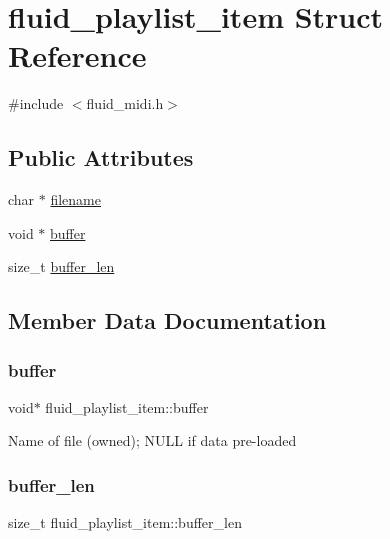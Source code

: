 \hypertarget{structfluid__playlist__item}{}\section{fluid\+\_\+playlist\+\_\+item Struct Reference}
\label{structfluid__playlist__item}


{\ttfamily \#include $<$fluid\+\_\+midi.\+h$>$}

\subsection*{Public Attributes}
\begin{DoxyCompactItemize}
\item 
char $\ast$ \hyperlink{structfluid__playlist__item_ae1363ff05cc7535485c858956fbf7eca}{filename}
\item 
void $\ast$ \hyperlink{structfluid__playlist__item_aba676687b8aa1f5f532120417d423b34}{buffer}
\item 
size\+\_\+t \hyperlink{structfluid__playlist__item_a8f6e851c06070fad3d5fff278f488d6d}{buffer\+\_\+len}
\end{DoxyCompactItemize}


\subsection{Member Data Documentation}
\mbox{\label{structfluid__playlist__item_aba676687b8aa1f5f532120417d423b34}} 
\subsubsection{\texorpdfstring{buffer}{buffer}}
{\footnotesize\ttfamily void$\ast$ fluid\+\_\+playlist\+\_\+item\+::buffer}

Name of file (owned); N\+U\+LL if data pre-\/loaded \mbox{\label{structfluid__playlist__item_a8f6e851c06070fad3d5fff278f488d6d}} 
\subsubsection{\texorpdfstring{buffer\+\_\+len}{buffer\_len}}
{\footnotesize\ttfamily size\+\_\+t fluid\+\_\+playlist\+\_\+item\+::buffer\+\_\+len}

